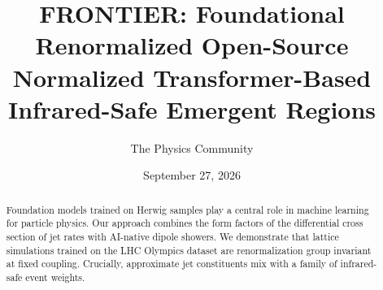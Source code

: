 \documentclass[11pt]{article}
\title{FRONTIER: Foundational Renormalized Open-Source Normalized Transformer-Based Infrared-Safe Emergent Regions}
\author{The Physics Community}
\date{September 27, 2026}
\numberwithin{equation}{section}
\theoremstyle{definition}
\theoremstyle{remark}
\begin{document}
\maketitle
\begin{abstract}
Foundation models trained on Herwig samples play a central role in
machine learning for particle physics. Our approach combines the form
factors of the differential cross section of jet rates with AI-native
dipole showers. We demonstrate that lattice simulations trained on the
LHC Olympics dataset are renormalization group invariant at fixed
coupling. Crucially, approximate jet constituents mix with a family of
infrared-safe event weights.
\end{abstract}
\tableofcontents




\nocite{*}


\end{document}
